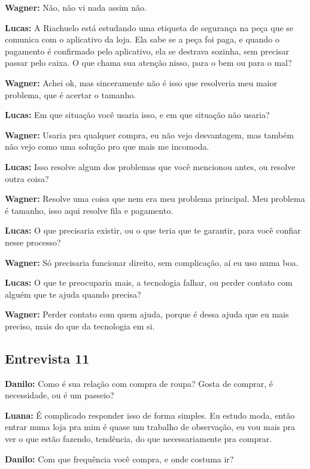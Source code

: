 \textbf{Wagner:} Não, não vi nada assim não.

\textbf{Lucas:} A Riachuelo está estudando uma etiqueta de segurança na peça que se comunica com o aplicativo da loja. Ela sabe se a peça foi paga, e quando o pagamento é confirmado pelo aplicativo, ela se destrava sozinha, sem precisar passar pelo caixa. O que chama sua atenção nisso, para o bem ou para o mal?

\textbf{Wagner:} Achei ok, mas sinceramente não é isso que resolveria meu maior problema, que é acertar o tamanho.

\textbf{Lucas:} Em que situação você usaria isso, e em que situação não usaria?

\textbf{Wagner:} Usaria pra qualquer compra, eu não vejo desvantagem, mas também não vejo como uma solução pro que mais me incomoda.

\textbf{Lucas:} Isso resolve algum dos problemas que você mencionou antes, ou resolve outra coisa?

\textbf{Wagner:} Resolve uma coisa que nem era meu problema principal. Meu problema é tamanho, isso aqui resolve fila e pagamento.

\textbf{Lucas:} O que precisaria existir, ou o que teria que te garantir, para você confiar nesse processo?

\textbf{Wagner:} Só precisaria funcionar direito, sem complicação, aí eu uso numa boa.

\textbf{Lucas:} O que te preocuparia mais, a tecnologia falhar, ou perder contato com alguém que te ajuda quando precisa?

\textbf{Wagner:} Perder contato com quem ajuda, porque é dessa ajuda que eu mais preciso, mais do que da tecnologia em si.


\subsection*{Entrevista 11}

\textbf{Danilo:} Como é sua relação com compra de roupa? Gosta de comprar, é necessidade, ou é um passeio?

\textbf{Luana:} É complicado responder isso de forma simples. Eu estudo moda, então entrar numa loja pra mim é quase um trabalho de observação, eu vou mais pra ver o que estão fazendo, tendência, do que necessariamente pra comprar.

\textbf{Danilo:} Com que frequência você compra, e onde costuma ir?

